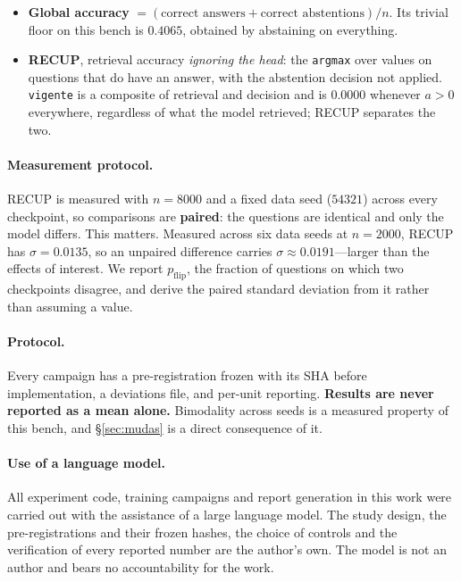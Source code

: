 \documentclass[11pt]{article}
\begin{document}
\begin{itemize}
\item \textbf{Global accuracy} $= (\text{correct answers} + \text{correct abstentions}) / n$. Its
trivial floor on this bench is $\mathbf{0.4065}$, obtained by abstaining on everything.
\item \textbf{RECUP}, retrieval accuracy \emph{ignoring the head}: the \texttt{argmax} over values on
questions that do have an answer, with the abstention decision not applied. \texttt{vigente} is a
composite of retrieval and decision and is $0.0000$ whenever $a > 0$ everywhere, regardless of what
the model retrieved; RECUP separates the two.
\end{itemize}

\paragraph{Measurement protocol.} RECUP is measured with $n = 8000$ and a fixed data seed
($54321$) across every checkpoint, so comparisons are \textbf{paired}: the questions are identical
and only the model differs. This matters. Measured across six data seeds at $n=2000$, RECUP has
$\sigma = 0.0135$, so an unpaired difference carries $\sigma \approx 0.0191$---larger than the
effects of interest. We report $p_{\mathrm{flip}}$, the fraction of questions on which two
checkpoints disagree, and derive the paired standard deviation from it rather than assuming a value.

\paragraph{Protocol.} Every campaign has a pre-registration frozen with its SHA before implementation,
a deviations file, and per-unit reporting. \textbf{Results are never reported as a mean alone.}
Bimodality across seeds is a measured property of this bench, and \S\ref{sec:mudas} is a direct
consequence of it.

\paragraph{Use of a language model.} All experiment code, training campaigns and report generation in
this work were carried out with the assistance of a large language model. The study design, the
pre-registrations and their frozen hashes, the choice of controls and the verification of every
reported number are the author's own. The model is not an author and bears no accountability for the
work.
\end{document}
